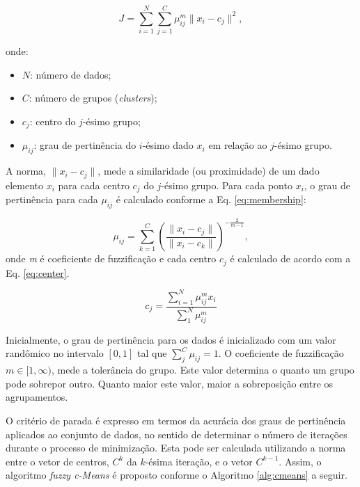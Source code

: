 \documentclass[12pt,a4paper]{article}
\numberwithin{equation}{section}
\begin{document}
\begin{equation} \label{eq:cost_function}
J=\sum_{i=1}^{N}\sum_{j=1}^{C}\mu_{ij}^{m}\lVert x_{i}-c_{j} \rVert^2,
\end{equation}

onde:
\begin{itemize}
	\item $N$: número de dados;
	\item $C$: número de grupos (\textit{clusters});
	\item $c_{j}$: centro do $j$-ésimo grupo;
	\item $\mu_{ij}$: grau de pertinência do $i$-ésimo dado $x_{i}$ em relação ao $j$-ésimo grupo.
\end{itemize}

A norma, $\lVert x_{i}-c_{j} \rVert$, mede a similaridade (ou proximidade) de um dado elemento $x_{i}$ para cada centro $c_{j}$ do $j$-ésimo grupo. Para cada ponto $x_{i}$, o grau de pertinência para cada $\mu_{ij}$ é calculado conforme a Eq. \eqref{eq:membership}:


\begin{equation} \label{eq:membership}
\mu_{ij}=\sum_{k=1}^{C}\left(\frac{\lVert x_{i}-c_{j} \rVert}{\lVert x_{i}-c_{k} \rVert}\right)^{-\frac{2}{m-1}},
\end{equation}
onde \textit{m} é coeficiente de fuzzificação e cada centro $c_{j}$ é calculado de acordo com a Eq. \eqref{eq:center}.

\begin{equation} \label{eq:center}
c_{j}=\frac{\sum_{i=1}^{N}\mu_{ij}^m x_{i}}{\sum_{1}^{N}\mu_{ij}^m}
\end{equation}

Inicialmente, o grau de pertinência para os dados é inicializado com um valor randômico no intervalo $[0,1]$ tal que $\sum_{j}^{C}\mu_{ij}=1$.
O coeficiente de fuzzificação $m \in [1,\infty)$, mede a tolerância do grupo. Este valor determina o quanto um grupo pode sobrepor outro. Quanto maior este valor, maior a sobreposição entre os agrupamentos.

O critério de parada é expresso em termos da acurácia dos graus de pertinência aplicados ao conjunto de dados, no sentido de determinar o número de iterações durante o processo de minimização. Esta pode ser calculada utilizando a norma entre o vetor de centros, $C^k$ da $k$-ésima iteração, e o vetor $C^{k-1}$. Assim, o algoritmo \textit{fuzzy c-Means} é proposto conforme o Algoritmo \ref{alg:cmeans} a seguir.
\\
\end{document}
